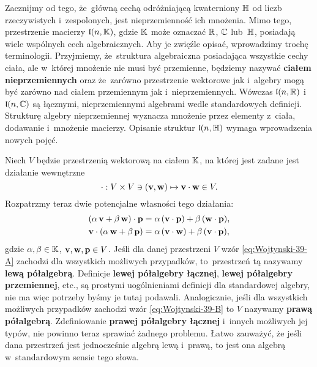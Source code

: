 \documentclass[a4paper,11pt]{article}
\begin{document}
Zacznijmy od tego, że~główną cechą odróżniającą kwaterniony $\mathbb{H}$ od liczb
rzeczywistych i~zespolonych, jest nieprzemienność ich mnożenia. Mimo tego,
przestrzenie macierzy $\mathfrak{l}( n, \mathbb{K} )$, gdzie $\mathbb{K}$ może oznaczać
$\mathbb{R}$, $\mathbb{C}$ lub~$\mathbb{H}$, posiadają wiele wspólnych cech algebraicznych.
Aby je zwięźle opisać, wprowadzimy trochę terminologii. Przyjmiemy,
że~struktura algebraiczna posiadająca wszystkie cechy ciała, ale w~której
mnożenie nie musi być przemienne, będziemy nazywać \textbf{ciałem
  nieprzemiennych} oraz że~zarówno przestrzenie wektorowe jak i~algebry mogą
być zarówno nad ciałem przemiennym jak i~nieprzemiennych. Wówczas
$\mathfrak{l}( n, \mathbb{R} )$ i~$\mathfrak{l}( n, \mathbb{C} )$ są łącznymi, nieprzemiennymi
algebrami wedle standardowych definicji. Strukturę algebry nieprzemiennej
wyznacza mnożenie przez elementy z~ciała, dodawanie i~mnożenie macierzy.
Opisanie struktur $\mathfrak{l}( n, \mathbb{H} )$ wymaga wprowadzenia nowych pojęć.

Niech $V$ będzie przestrzenią wektorową na ciałem $\mathbb{K}$, na której jest
zadane jest działanie wewnętrzne
\begin{equation}
  \label{eq:Wojtynsi-38}
  \cdot : V \times V \ni ( \mathbf{v}, \mathbf{w} ) \mapsto \mathbf{v} \cdot \mathbf{w} \in V.
\end{equation}
Rozpatrzmy teraz dwie potencjalne własności tego działania:
\begin{subequations}
  \begin{align}
    \label{eq:Wojtynski-39-A}
    &( \alpha \, \mathbf{v} + \beta \, \mathbf{w} ) \cdot \mathbf{p} =
      \alpha \, ( \mathbf{v} \cdot \mathbf{p} ) + \beta \, ( \mathbf{w} \cdot \mathbf{p} ), \\
    \label{eq:Wojtynski-39-B}
    &\mathbf{v} \cdot ( \alpha \, \mathbf{w} + \beta \, \mathbf{p} ) =
      \alpha \, ( \mathbf{v} \cdot \mathbf{w} ) + \beta \, ( \mathbf{v} \cdot \mathbf{p} ),
  \end{align}
\end{subequations}
gdzie $\alpha, \beta \in \mathbb{K}$, $\mathbf{v}, \mathbf{w}, \mathbf{p} \in V$. Jeśli dla
danej przestrzeni $V$ wzór \eqref{eq:Wojtynski-39-A} zachodzi dla
wszystkich możliwych przypadków, to~przestrzeń tą nazywamy \textbf{lewą
  półalgebrą}. Definicje \textbf{lewej półalgebry łącznej}, \textbf{lewej
  półalgebry przemiennej}, etc., są prostymi uogólnieniami definicji dla
standardowej algebry, nie ma więc potrzeby byśmy je tutaj podawali.
Analogicznie, jeśli dla wszystkich
możliwych przypadków zachodzi wzór \eqref{eq:Wojtynski-39-B} to $V$ nazywamy
\textbf{prawą półalgebrą}. Zdefiniowanie \textbf{prawej półalgebry łącznej}
i~innych możliwych jej typów, nie powinno teraz sprawiać żadnego problemu.
Łatwo zauważyć, że jeśli dana przestrzeń jest jednocześnie algebrą lewą
i~prawą, to jest ona algebrą w~standardowym sensie tego słowa.
\end{document}
